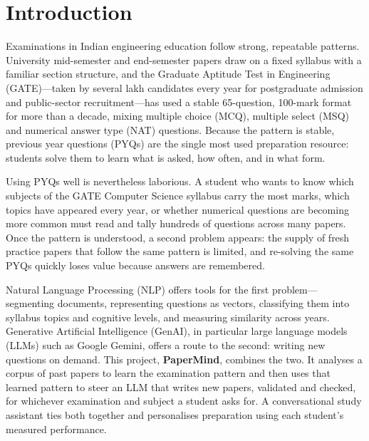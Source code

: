 \chapter{Introduction}
Examinations in Indian engineering education follow strong, repeatable patterns. University mid-semester and
end-semester papers draw on a fixed syllabus with a familiar section structure, and the Graduate Aptitude Test in
Engineering (GATE)---taken by several lakh candidates every year for postgraduate admission and public-sector
recruitment---has used a stable 65-question, 100-mark format for more than a decade, mixing multiple choice (MCQ),
multiple select (MSQ) and numerical answer type (NAT) questions. Because the pattern is stable, previous year questions
(PYQs) are the single most used preparation resource: students solve them to learn what is asked, how often, and in
what form.

Using PYQs well is nevertheless laborious. A student who wants to know which subjects of the GATE Computer Science
syllabus carry the most marks, which topics have appeared every year, or whether numerical questions are becoming more
common must read and tally hundreds of questions across many papers. Once the pattern is understood, a second problem
appears: the supply of fresh practice papers that follow the same pattern is limited, and re-solving the same PYQs
quickly loses value because answers are remembered.

Natural Language Processing (NLP) offers tools for the first problem---segmenting documents, representing questions as
vectors, classifying them into syllabus topics and cognitive levels, and measuring similarity across years. Generative
Artificial Intelligence (GenAI), in particular large language models (LLMs) such as Google Gemini, offers a route to the
second: writing new questions on demand. This project, \textbf{PaperMind}, combines the two. It analyses a corpus of past
papers to learn the examination pattern and then uses that learned pattern to steer an LLM that writes new papers,
validated and checked, for whichever examination and subject a student asks for. A conversational study assistant ties
both together and personalises preparation using each student's measured performance.

